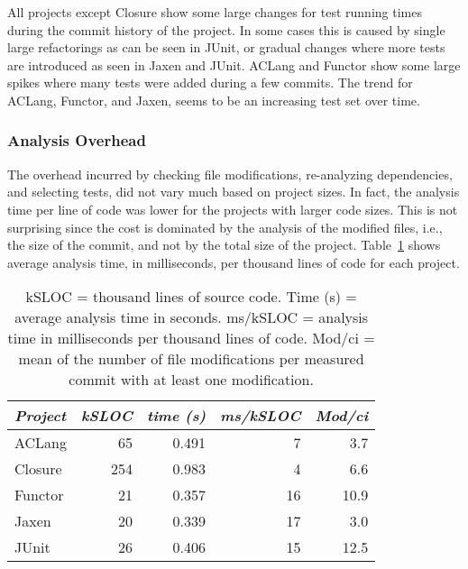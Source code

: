 {All projects except Closure show some large changes for test running times during the commit
history of the project. In some cases this is caused by single large refactorings as can be seen
in JUnit, or gradual changes where more tests are introduced as seen in Jaxen and JUnit.
ACLang and Functor show some large spikes where many tests were added during a few commits.
The trend for ACLang, Functor, and Jaxen, seems to be an increasing test set over time.


\subsubsection{Analysis Overhead}

The overhead incurred by checking file modifications, re-analyzing
dependencies, and selecting tests, did not vary
much based on project sizes. In fact, the analysis time per line of code
was lower for the projects with larger code sizes.
This is not surprising since the cost is dominated by the analysis of the modified files, i.e., the size of the commit, and not by the total size of the project.
Table~\ref{tbl:overhead}
shows average analysis time, in milliseconds, per thousand lines of code for each project.

\begin{table}[h]
  \centering
\begin{tabular}{l|r|r|r|r}
  \emph{Project} & \emph{kSLOC} & \emph{time (s)} & \emph{ms/kSLOC} & \emph{Mod/ci} \\
  \hline
   ACLang &  65 &   0.491 &  7 &     3.7 \\
  Closure & 254 &   0.983 &  4 &     6.6 \\
  Functor &  21 &   0.357 & 16 &    10.9 \\
    Jaxen &  20 &   0.339 & 17 &     3.0 \\
    JUnit &  26 &   0.406 & 15 &    12.5 \\
  \hline
\end{tabular}
\caption{kSLOC = thousand lines of source code.
Time (s) = average analysis time in seconds.
ms/kSLOC = analysis time in milliseconds per thousand lines of code.
Mod/ci = mean of the number of file modifications per measured commit
with at least one modification.}
\label{tbl:overhead}
\end{table}

}
